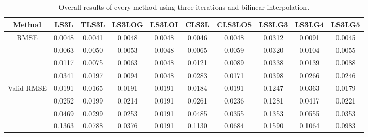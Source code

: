 \begin{table}[ht!]
\centering
\begin{tabular}{c|c|c|c|c|c|c|c|c|c}
Method & \scriptsize{LS3L} & \scriptsize{TLS3L} & \scriptsize{LS3LOG} & \scriptsize{LS3LOI} & \scriptsize{CLS3L} & \scriptsize{CLS3LOS} & \scriptsize{LS3LG3} & \scriptsize{LS3LG4} & \scriptsize{LS3LG5}\\ \hline 
\multirow{4}{*}{RMSE} & 0.0048 & 0.0041 & 0.0048 & 0.0048 & 0.0046 & 0.0048 & 0.0312 & 0.0091 & 0.0045 \\ 
 & 0.0063 & 0.0050 & 0.0053 & 0.0048 & 0.0065 & 0.0059 & 0.0320 & 0.0104 & 0.0055 \\ 
 & 0.0117 & 0.0075 & 0.0063 & 0.0048 & 0.0121 & 0.0089 & 0.0338 & 0.0139 & 0.0088 \\ 
 & 0.0341 & 0.0197 & 0.0094 & 0.0048 & 0.0283 & 0.0171 & 0.0398 & 0.0266 & 0.0246 \\ 
 \hline
\multirow{4}{*}{Valid RMSE} & 0.0191 & 0.0165 & 0.0191 & 0.0191 & 0.0184 & 0.0191 & 0.1247 & 0.0363 & 0.0179 \\ 
 & 0.0252 & 0.0199 & 0.0214 & 0.0191 & 0.0261 & 0.0236 & 0.1281 & 0.0417 & 0.0221 \\ 
 & 0.0469 & 0.0299 & 0.0253 & 0.0191 & 0.0485 & 0.0355 & 0.1353 & 0.0555 & 0.0353 \\ 
 & 0.1363 & 0.0788 & 0.0376 & 0.0191 & 0.1130 & 0.0684 & 0.1590 & 0.1064 & 0.0983 \\ 
 \hline 
\end{tabular}
\caption{Overall results of every method using three iterations and bilinear interpolation.}
\label{tab:3itL}
\end{table}


